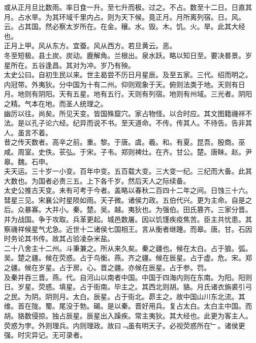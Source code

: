 \documentclass{zhvt-classic}
\begin{document}
\hspace*{2em}或从正月旦比数雨。率日食一升。至七升而极。过之。不占。数至十二日。日直其月。占水旱。为其环域千里内占。则为天下候。竟正月。月所离列宿。日。风。云。占其国。然必察太岁所在。在金。穰。水。毁。木。饥。火。旱。此其大经也。\\
\hspace*{2em}正月上甲。风从东方。宜蚕。风从西方。若旦黄云。恶。\\
\hspace*{2em}冬至短极。县土炭。炭动。鹿解角。兰根出。泉水跃。略以知日至。要决晷景。岁星所在。五谷逢昌。其对为冲。岁乃有殃。\\
\hspace*{2em}太史公曰。自初生民以来。世主曷尝不历日月星辰。及至五家。三代。绍而明之。内冠带。外夷狄。分中国为十有二州。仰则观象于天。俯则法类于地。天则有日月。地则有阴阳。天有五星。地有五行。天则有列宿。地则有州域。三光者。阴阳之精。气本在地。而圣人统理之。\\
\hspace*{2em}幽厉以往。尚矣。所见天变。皆国殊窟穴。家占物怪。以合时应。其文图籍禨祥不法。是以孔子论六经。纪异而说不书。至天道命。不传。传其人。不待告。告非其人。虽言不着。\\
\hspace*{2em}昔之传天数者。高辛之前。重。黎。于唐。虞。羲。和。有夏。昆吾。殷商。巫咸。周室。史佚。苌弘。于宋。子韦。郑则裨灶。在齐。甘公。楚。唐眛。赵。尹皋。魏。石申。\\
\hspace*{2em}夫天运。三十岁一小变。百年中变。五百载大变。三大变一纪。三纪而大备。此其大数也。为国者必贵三五。上下各千岁。然后天人之际续备。\\
\hspace*{2em}太史公推古天变。未有可考于今者。盖略以春秋二百四十二年之间。日蚀三十六。彗星三见。宋襄公时星陨如雨。天子微。诸侯力政。五伯代兴。更为主命。自是之后。众暴寡。大并小。秦。楚。吴。越。夷狄也。为强伯。田氏篡齐。三家分晋。并为战国。争于攻取。兵革更起。城邑数屠。因以饥馑疾疫焦苦。臣主共忧患。其察禨祥候星气尤急。近世十二诸侯七国相王。言从衡者继踵。而皋。唐。甘。石因时务论其书传。故其占验凌杂米盐。\\
\hspace*{2em}二十八舍主十二州。斗秉兼之。所从来久矣。秦之疆也。候在太白。占于狼。弧。吴。楚之疆。候在荧惑。占于鸟衡。燕。齐之疆。候在辰星。占于虚。危。宋。郑之疆。候在岁星。占于房。心。晋之疆。亦候在辰星。占于参。罚。\\
\hspace*{2em}及秦并吞三晋。燕。代。自河山以南者中国。中国于四海内则在东南。为阳。阳则日。岁星。荧惑。填星。占于街南。毕主之。其西北则胡。貉。月氏诸衣旃裘引弓之民。为阴。阴则月。太白。辰星。占于街北。昴主之。故中国山川东北流。其维。首在陇。蜀。尾没于勃。碣。是以秦。晋好用兵。复占太白。太白主中国。而胡。貉数侵掠。独占辰星。辰星出入躁疾。常主夷狄。其大经也。此更为客主人。荧惑为孛。外则理兵。内则理政。故曰﹁虽有明天子。必视荧惑所在﹂。诸侯更强。时灾异记。无可录者。\\
\end{document}
